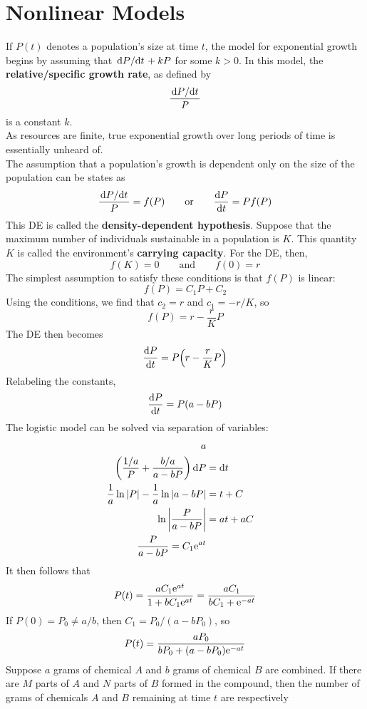 \documentclass[./Differential Equations.tex]{subfiles}
\begin{document}
	\section{Nonlinear Models}
			If \(P(t)\) denotes a population's size at time \(t\), the model for exponential growth begins by assuming that \(\dv*{P}{t} + kP\) for some \(k > 0\). In this model, the \textbf{relative/specific growth rate}, as defined by
				\[\frac{\dv*{P}{t}}{P}\]
				is a constant \(k\). \\
			As resources are finite, true exponential growth over long periods of time is essentially unheard of. \\
			The assumption that a population's growth is dependent only on the size of the population can be states as
				\[\frac{\dv*{P}{t}}{P} = f(P) \qquad \text{or} \qquad \dv{P}{t} = Pf(P)\]
				This DE is called the \textbf{density-dependent hypothesis}.
			Suppose that the maximum number of individuals sustainable in a population is \(K\). This quantity \(K\) is called the environment's \textbf{carrying capacity}. For the DE, then,
				\[f(K) = 0 \qquad \text{and} \qquad f(0) = r\]
			 	The simplest assumption to satisfy these conditions is that \(f(P)\) is linear:
			 	\[f(P) = C_1P + C_2\]
			 	Using the conditions, we find that \(c_2 = r\) and \(c_1 = -r/K\), so 
			 	\[f(P) = r - \frac{r}{K}P\]
			 	The DE then becomes
			 	\[\dv{P}{t} = P\Bigl(r - \frac{r}{K}P\Bigr)\]
			 	Relabeling the constants,
			 	\[\dv{P}{t} = P(a - bP)\]
			The logistic model can be solved via separation of variables:
				\begin{align*}
				a \\
					\left(\frac{1/a}{P} + \frac{b/a}{a - bP}\right)\dd{P} &= \dd{t} \\
					\frac{1}{a}\ln|P| - \frac{1}{a}\ln|a - bP| &= t + C \\
					\ln\left|\frac{P}{a - bP}\right| &= at + aC \\
					\frac{P}{a - bP} = C_1\text{e}^{at}
				\end{align*}
				It then follows that
				\[P(t) = \frac{aC_1\text{e}^{at}}{1 + bC_1\text{e}^{at}} = \frac{aC_1}{bC_1 + \text{e}^{-at}}\]
				If \(P(0) = P_0 \ne a/b\), then \(C_1 = P_0/(a - bP_0)\), so
				\[P(t) = \frac{aP_0}{bP_0 + (a - bP_0)\text{e}^{-at}}\]
			Suppose \(a\) grams of chemical \(A\) and \(b\) grams of chemical \(B\) are combined. If there are \(M\) parts of \(A\) and \(N\) parts of \(B\) formed in the compound, then the number of grams of chemicals \(A\) and \(B\) remaining at time \(t\) are respectively
\end{document}
